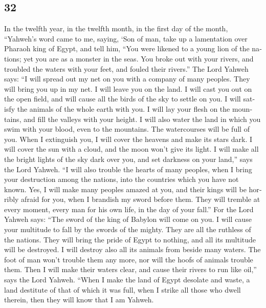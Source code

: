 \begin{paracol}{2}
\switchcolumn
\begin{otherlanguage}{english}

\hypertarget{section-63}{%
\section{32}\label{section-63}}

 In the twelfth year, in the twelfth month, in the first
day of the month, ``Yahweh's word came to me, saying, 
`Son of man, take up a lamentation over Pharaoh king of Egypt, and tell
him, ``You were likened to a young lion of the nations; yet you are as a
monster in the seas. You broke out with your rivers, and troubled the
waters with your feet, and fouled their rivers.''  The
Lord Yahweh says: ``I will spread out my net on you with a company of
many peoples. They will bring you up in my net.  I will
leave you on the land. I will cast you out on the open field, and will
cause all the birds of the sky to settle on you. I will satisfy the
animals of the whole earth with you.  I will lay your
flesh on the mountains, and fill the valleys with your height.
 I will also water the land in which you swim with your
blood, even to the mountains. The watercourses will be full of you.
 When I extinguish you, I will cover the heavens and make
its stars dark. I will cover the sun with a cloud, and the moon won't
give its light.  I will make all the bright lights of the
sky dark over you, and set darkness on your land,'' says the Lord
Yahweh.  ``I will also trouble the hearts of many peoples,
when I bring your destruction among the nations, into the countries
which you have not known.  Yes, I will make many peoples
amazed at you, and their kings will be horribly afraid for you, when I
brandish my sword before them. They will tremble at every moment, every
man for his own life, in the day of your fall.''  For the
Lord Yahweh says: ``The sword of the king of Babylon will come on you.
 I will cause your multitude to fall by the swords of the
mighty. They are all the ruthless of the nations. They will bring the
pride of Egypt to nothing, and all its multitude will be destroyed.
 I will destroy also all its animals from beside many
waters. The foot of man won't trouble them any more, nor will the hoofs
of animals trouble them.  Then I will make their waters
clear, and cause their rivers to run like oil,'' says the Lord Yahweh.
 ``When I make the land of Egypt desolate and waste, a
land destitute of that of which it was full, when I strike all those who
dwell therein, then they will know that I am Yahweh.


\end{otherlanguage}
\end{paracol}
